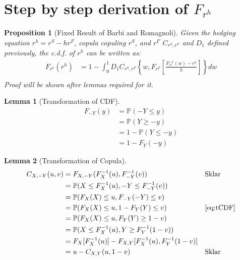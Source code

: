 \documentclass[11pt, leqno]{article}
\newtheorem{prop}{Proposition}[section]
\newtheorem{lemma}{Lemma}[section]
\numberwithin{equation}{section}
\begin{document}
    \section{Step by step derivation of $F_{r^h}$}\label{sec:steps}
\begin{prop}[Fixed Result of Barbi and Romagnoli]\label{prop:BarbiRoma}
Given the hedging equation $r^h = r^S - hr^F$, copula copuling $r^S$, and $r^F$ $C_{r^S, r^F}$ and $D_1$ defined previously,
the c.d.f. of $r^h$ can be written as:
    \begin{align*}
        F_{r^h}(r^h)
        &= 1- \int^1_0 D_1 C_{r^S, r^F}
        \left\{
        w,
        F_{r^F}
        \left[
        \frac{F^{-1}_{r^S}(w)-r^h}{h}
        \right]
        \right\}dw \\
    \end{align*}
Proof will be shown after lemmas required for it.
\end{prop}
\begin{lemma}[Transformation of CDF]
    \begin{align}
        F_{-Y}(y)
        &= \mathbb{P}(-Y \leq y) \nonumber\\
        &= \mathbb{P}(Y \geq -y) \nonumber\\
        &= 1 - \mathbb{P}(Y \leq -y)\nonumber\\
        &= 1 - F_{Y}(-y)   \label{eq:tCDF}
    \end{align}
\end{lemma}
\begin{lemma}[Transformation of Copula]
    \begin{align}
        C_{X,-Y}(u,v) &=
        F_{X,-Y}(F_X^{-1}(u),F_{-Y}^{-1}(v)) &&\text{Sklar}\nonumber\\
        &=
        \mathbb{P}(X \leq F_X^{-1}(u), -Y \leq F_{-Y}^{-1}(v)) \nonumber\\
        &=
        \mathbb{P}(F_X(X) \leq u, F_{-Y}(-Y) \leq v) \nonumber\\
        &=
        \mathbb{P}(F_X(X) \leq u, 1-F_{Y}(Y) \leq v) && \text{\eqref{eq:tCDF}}\nonumber\\
        &=
        \mathbb{P}(F_X(X) \leq u, F_{Y}(Y) \geq 1-v) \nonumber\\
        &=
        \mathbb{P}(X \leq F_X^{-1}(u), Y \geq F_Y^{-1}(1-v)) \nonumber\\
        &=
        F_X[F_X^{-1}(u)] - F_{X,Y}[F_X^{-1}(u), F_Y^{-1}(1-v)] \nonumber\\
        &=
        u - C_{X,Y}(u, 1-v) &&\text{Sklar} \label{eq:trans-Copula}
    \end{align}
\end{lemma}
\end{document}
